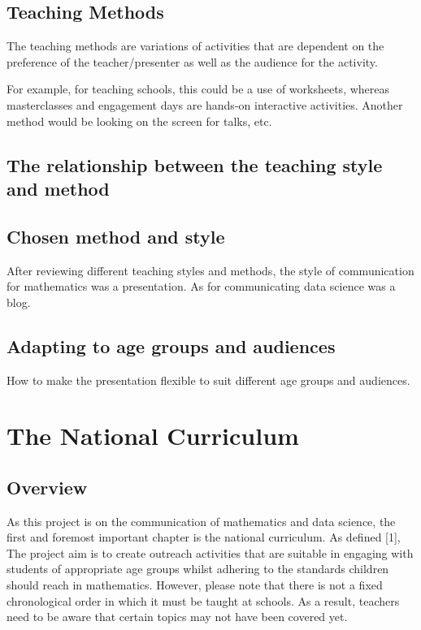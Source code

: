 \documentclass[12pt, a4paper,oneside]{book}
\numberwithin{equation}{section}
\begin{document}
\section{Teaching Methods}

The teaching methods are variations of activities that are dependent on the preference of the teacher/presenter as well as the audience for the activity.

For example, for teaching schools, this could be a use of worksheets, whereas masterclasses and engagement days are hands-on interactive activities. Another method would be looking on the screen for talks, etc.

\section{The relationship between the teaching style and method}

\section{Chosen method and style}

After reviewing different teaching styles and methods, the style of communication for mathematics was a presentation. As for communicating data science was a blog.

\section{Adapting to age groups and audiences}

How to make the presentation flexible to suit different age groups and audiences.

\chapter{The National Curriculum}
\section{Overview}
As this project is on the communication of mathematics and data science, the first and foremost important chapter is the national curriculum. As defined [1], The project aim is to create outreach activities that are suitable in engaging with students of appropriate age groups whilst adhering to the standards children should reach in mathematics. However, please note that there is not a fixed chronological order in which it must be taught at schools. As a result, teachers need to be aware that certain topics may not have been covered yet.
\end{document}

